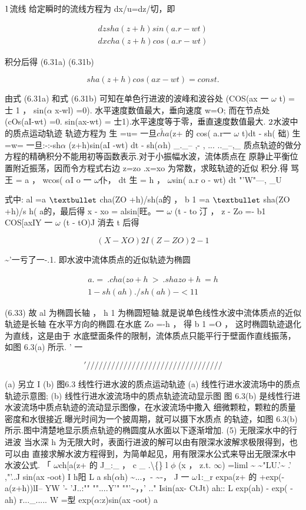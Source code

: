 ${\rm 1}$流线 给定瞬时的流线方程为 dx/u=dz/切，即

\begin{gather*}
dz sha(z+h)sin( a.r -wt)\\
dx cha(z + h )cos( a.r - wt)
\end{gather*}

积分后得 (6.31a) (6.31b)

\begin{equation*}sha(z+h)cos(ax -wt) = const.\tag{6.32}\end{equation*}

由式 (6.31a) 和式 (6.31b) 可知在单色行进波的波峰和波谷处 (COS(ax 一 $\omega$ t) = 士 1 ， sin($\alpha$ x-wl) =0). 水平速度数值最大，垂向速度 w=O; 而在节点处 (cOs(aI-wt) =0. sin(ax-wt) = 士1).水平速度等于零，垂直速度数值最大. ${\rm 2}$水波中的质点运动轨迹 轨迹方程为 生 =u= 一旦$\tilde{cha}$(z+ 的 cos( a.r一 $\omega$ t)dt - sh( 础) 生 =w= 一旦:-:-sh$\alpha$ (z+h)sin(aI -wt) dt - sh($\alpha$h) \_.\_-- ,- , ... ..\_--,\_ 质点轨迹的做分方程的精确积分不能用初等函数表示.对于小振幅水波，流体质点在 原静止平衡位置附近振荡，因而令方程式右边 z=zo .x=xo 为常数，求眩轨迹的近似 积分.得 骂王 = a ， wcos( $\alpha$I o 一 $\omega$仆， dt 生 = h ， $\omega$sin( a.r o - wt) dt "'W"---, \_U

式中: al =a ${\rm •}$ cha(ZO +h)/sh(a的 ， b 1 =a ${\rm •}$ sha(ZO +h)/s h( a的，最后得 x - xo = alsin[旺。一 $\omega$ (t - to 汀 ， z - Zo =- b1 COS[axIY 一 $\omega$ (t - tO)J 消去 t 后得

\[(X-X O) 2 I (Z-Z O)2 - 1\]

\textasciitilde{}'一亏了一-.1. 即水波中流体质点的近似轨迹为椭圆

\begin{gather*}
a. = ~. cha(z o + h ~>~. shaz o + h~=h\\
1 - sh(ah) ./ sh(ah) - <11
\end{gather*}

(6.33) 故 al 为椭圆长轴 ， h 1 为椭圆短轴.就是说单色线性水波中流体质点的近似轨迹是长轴 在水平方向的椭圆.在水底 Zo =-h ， 得 b 1 =O ， 这时椭圆轨迹退化为直线，这是由于 水底壁面条件的限制，流体质点只能平行于壁面作直线振荡，如图 6.3(a) 所示. ' 一

\['/////////// / /////////////////////\]

(a) 另立 I (b) 图6.3 线性行进水波的质点运动轨迹 (a) 线性行进水波流场中的质点轨迹示意图; (b) 线性行进水波流场中的质点轨迹流动显示图 图 6.3(b) 是线性行进水波流场中质点轨迹的流动显示图像，在水波流场中撒入 细微颗粒，颗粒的质量密度和水很接近.曝光时间为一个披周期，就可以摄下水质点 的轨迹，如图 6.3(b) 所示.图中清楚地显示质点轨迹的椭圆度从水面以下逐渐增加. (5) 无限深水中的行进波 当水深 h 为无限大时，表面行进波的解可以由有限深水波解求极限得到，也可以由 直接求解水波方程得到，为简单起见，用有限深水公式来导出无限深水中水波公式. 「 $\omega$ch[a(z+ 的 J\_:\_ ， c \_ .\textbackslash\{\} l $\phi$ (x ， z.t. $\infty$) =liml \textasciitilde{} \textasciitilde{}"LU.'\textasciitilde{} .' ,"'..J sin(ax -oot) I h阳 L a sh($\alpha$h) \textasciitilde{}...，- \textasciitilde{}-， J 一 $\omega$1:\_r expa(z+ 的 +exp(-a(z+h))lI-- YW '- 'J..:"" ""....Y'" ""'\textasciitilde{}，，' .." Isin(ax- CtJt) ah:: L exp(ah) - exp( - ah) r...\_..... W =型 exp($\alpha$:z)sin(ax -oot) a


